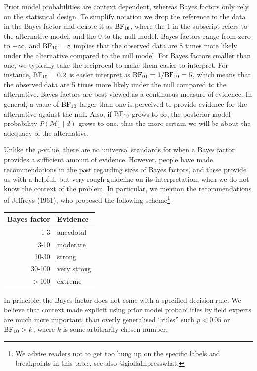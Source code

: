 \documentclass[english,,doc,floatsintext]{apa6}
\let\rmarkdownfootnote\footnote%
\def\footnote{\protect\rmarkdownfootnote}
\begin{document}
Prior model probabilities are context dependent, whereas Bayes factors only rely on the statistical design. To simplify notation we drop the reference to the data in the Bayes factor and denote it as \(\textnormal{BF}_{10}\), where the 1 in the subscript refers to the alternative model, and the 0 to the null model. Bayes factors range from zero to \(+ \infty\), and \(\textnormal{BF}_{10} = 8\) implies that the observed data are 8 times more likely under the alternative compared to the null model. For Bayes factors smaller than one, we typically take the reciprocal to make them easier to interpret. For instance, \(\textnormal{BF}_{10} = 0.2\) is easier interpret as \(\textnormal{BF}_{01} = 1/\textnormal{BF}_{10} = 5\), which means that the observed data are 5 times more likely under the null compared to the alternative. Bayes factors are best viewed as a continuous measure of evidence. In general, a value of \(\textnormal{BF}_{10}\) larger than one is perceived to provide evidence for the alternative against the null. Also, if \(\textnormal{BF}_{10}\) grows to \(\infty\), the posterior model probability \(P(\mathcal{M}_{1} \mid d)\) grows to one, thus the more certain we will be about the adequacy of the alternative.

Unlike the \(p\)-value, there are no universal standards for when a Bayes factor provides a sufficient amount of evidence. However, people have made recommendations in the past regarding sizes of Bayes factors, and these provide us with a helpful, but very rough guideline on its interpretation, when we do not know the context of the problem. In particular, we mention the recommendations of Jeffreys (1961), who proposed the following scheme\footnote{We advise readers not to get too hung up on the specific labels and breakpoints in this table, see also @giollaInpresswhat.}:

\begin{center}
\begin{tabular}{rl}
Bayes factor & Evidence\\
\hline
1-3 & anecdotal\\
3-10 & moderate\\
10-30 & strong\\
30-100 & very strong\\
\( > \)100 & extreme\\
\end{tabular}
\end{center}

In principle, the Bayes factor does not come with a specified decision rule. We believe that context made explicit using prior model probabilities by field experts are much more important, than overly generalised \enquote{rules} such \(p < 0.05\) or \(\textnormal{BF} _{10} > k\), where \(k\) is some arbitrarily chosen number.
\end{document}
